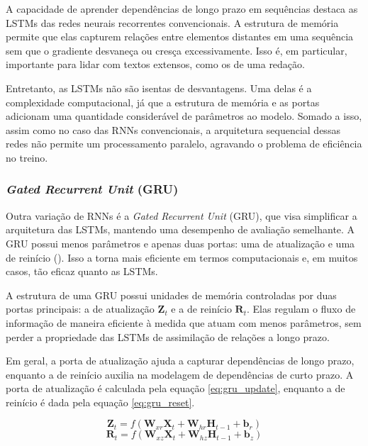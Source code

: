A capacidade de aprender dependências de longo prazo em sequências destaca as LSTMs das redes neurais recorrentes convencionais. A estrutura de memória permite que elas capturem relações entre elementos distantes em uma sequência sem que o gradiente desvaneça ou cresça excessivamente. Isso é, em particular, importante para lidar com textos extensos, como os de uma redação.

Entretanto, as LSTMs não são isentas de desvantagens. Uma delas é a complexidade computacional, já que a estrutura de memória e as portas adicionam uma quantidade considerável de parâmetros ao modelo. Somado a isso, assim como no caso das RNNs convencionais, a arquitetura sequencial dessas redes não permite um processamento paralelo, agravando o problema de eficiência no treino.

\subsubsection{\textit{Gated Recurrent Unit} (GRU)}

Outra variação de RNNs é a \textit{Gated Recurrent Unit} (GRU), que visa simplificar a arquitetura das LSTMs, mantendo uma desempenho de avaliação semelhante. A GRU possui menos parâmetros e apenas duas portas: uma de atualização e uma de reinício (\cite{cho2014learning}). Isso a torna mais eficiente em termos computacionais e, em muitos casos, tão eficaz quanto as LSTMs.

A estrutura de uma GRU possui unidades de memória controladas por duas portas principais: a de atualização $\boldsymbol{Z}_{t}$ e a de reinício $\boldsymbol{R}_{t}$. Elas regulam o fluxo de informação de maneira eficiente à medida que atuam com menos parâmetros, sem perder a propriedade das LSTMs de assimilação de relações a longo prazo.

Em geral, a porta de atualização ajuda a capturar dependências de longo prazo, enquanto a de reinício auxilia na modelagem de dependências de curto prazo. A porta de atualização é calculada pela equação \ref{eq:gru_update}, enquanto a de reinício é dada pela equação \ref{eq:gru_reset}.

\begin{equation}
    \label{eq:gru_update}
    \boldsymbol{Z}_{t} = f \left( \boldsymbol{W}_{xr} \boldsymbol{X}_{t} + \boldsymbol{W}_{hr} \boldsymbol{H}_{t-1} + \boldsymbol{b}_{r} \right)
\end{equation}
\begin{equation}
    \label{eq:gru_reset}
    \boldsymbol{R}_{t} = f \left( \boldsymbol{W}_{xz} \boldsymbol{X}_{t} + \boldsymbol{W}_{hz} \boldsymbol{H}_{t-1} + \boldsymbol{b}_{z} \right)
\end{equation}

